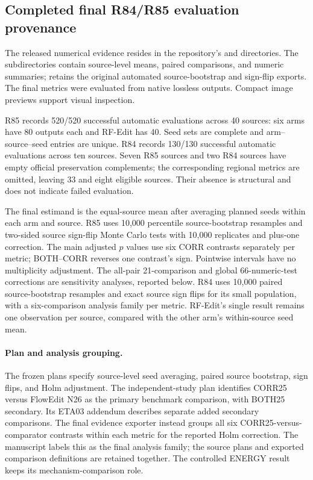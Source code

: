 \subsection{Completed final R84/R85 evaluation provenance}
\label{app:final-provenance}
The released numerical evidence resides in the repository's  and  directories. The  subdirectories contain source-level means, paired comparisons, and numeric summaries;  retains the original automated source-bootstrap and sign-flip exports. The final metrics were evaluated from native lossless outputs. Compact image previews support visual inspection.

R85 records 520/520 successful automatic evaluations across 40 sources: six arms have 80 outputs each and RF-Edit has 40. Seed sets are complete and arm--source--seed entries are unique. R84 records 130/130 successful automatic evaluations across ten sources. Seven R85 sources and two R84 sources have empty official preservation complements; the corresponding regional metrics are omitted, leaving 33 and eight eligible sources. Their absence is structural and does not indicate failed evaluation.

The final estimand is the equal-source mean after averaging planned seeds within each arm and source. R85 uses 10,000 percentile source-bootstrap resamples and two-sided source sign-flip Monte Carlo tests with 10,000 replicates and plus-one correction. The main adjusted $p$ values use six CORR contrasts separately per metric; BOTH--CORR reverses one contrast's sign. Pointwise intervals have no multiplicity adjustment. The all-pair 21-comparison and global 66-numeric-test corrections are sensitivity analyses, reported below. R84 uses 10,000 paired source-bootstrap resamples and exact source sign flips for its small population, with a six-comparison analysis family per metric. RF-Edit's single result remains one observation per source, compared with the other arm's within-source seed mean.

\paragraph{Plan and analysis grouping.}
The frozen plans specify source-level seed averaging, paired source bootstrap, sign flips, and Holm adjustment. The independent-study plan identifies CORR25 versus FlowEdit N26 as the primary benchmark comparison, with BOTH25 secondary. Its ETA03 addendum describes separate added secondary comparisons. The final evidence exporter instead groups all six CORR25-versus-comparator contrasts within each metric for the reported Holm correction. The manuscript labels this as the final analysis family; the source plans and exported comparison definitions are retained together. The controlled ENERGY result keeps its mechanism-comparison role.

